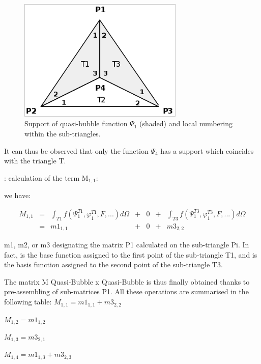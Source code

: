 \begin{figure}[H]%
\begin{center}
%
  \includegraphics[width=0.7\textwidth]{./graphics/quasi-bubble-support}
%
\end{center}
\caption{Support of quasi-bubble function $\Psi _{1}$ (shaded) and local
numbering within the sub-triangles.}
\label{fig:quasibubblesupport}
\end{figure}

It can thus be observed that only the function $\Psi _{4}$ has a support which
coincides with the triangle T.

: calculation of the term M${}_{1,1}$:

we have:

\[
\begin{array}{ccccccc}
M_{1,1} & = & \int _{T1}f(\Psi _{1}^{T1} ,\varphi _{1}^{T1} ,F,...)d\Omega & + & 0 & + & \int _{T3}f(\Psi _{1}^{T3} ,\varphi _{1}^{T3} ,F,...)d\Omega \\
& = &            m1_{1,1}                                                  & + & 0 & + & m3_{2,2}
\end{array}
\]

m1, m2, or m3 designating the matrix P1 calculated on the sub-triangle Pi. In
fact,  is the base function assigned to the first point of the sub-triangle T1,
and  is the basis function assigned to the second point of the sub-triangle T3.

The matrix M Quasi-Bubble x Quasi-Bubble is thus finally obtained thanks to
pre-assembling of sub-matrices P1. All these operations are summarised in the
following table:
$M_{1,1} = m1_{1,1} + m3_{2,2}$

$M_{1,2} = m1_{1,2}$

$M_{1,3} = m3_{2,1}$

$M_{1,4} = m1_{1,3} + m3_{2,3}$

